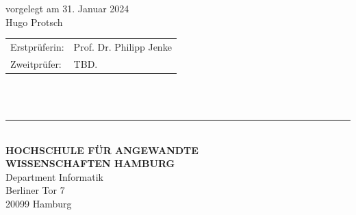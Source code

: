 \begin{titlepage}
  vorgelegt am 31. Januar 2024\\
  Hugo Protsch

  \vspace{5cm}

  \hspace*{37mm}
  \begin{minipage}{0.5\linewidth}
    \begin{tabular}{@{}ll}
      Erstprüferin: & Prof. Dr. Philipp Jenke\\[-.3mm]
      Zweitprüfer: & TBD. \\
    \end{tabular}\\

    \,\rule{9mm}{1mm}\\[1.5mm]

    \textbf{HOCHSCHULE FÜR ANGEWANDTE}\\
    \textbf{WISSENSCHAFTEN HAMBURG}\\
    Department Informatik\\
    Berliner Tor 7\\
    20099 Hamburg
  \end{minipage}
\end{titlepage}
\restoregeometry

\thispagestyle{empty}
